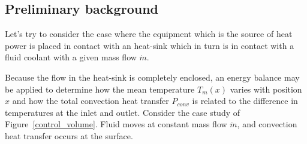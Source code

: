 \documentclass[12pt,a4paper,oneside]{book}
\begin{document}
\begin{onehalfspace}
\subsection{Preliminary background}
Let's try to consider the case where the equipment which is the source of heat power is placed in contact with an heat-sink which in turn is in contact with a fluid coolant with a given mass flow $\dot{m}$.

Because the flow in the heat-sink is completely enclosed, an energy balance may be applied to determine how the mean temperature $T_m(x)$ varies with position $x$ and how the total convection heat transfer $P_{conv}$ is related to the difference in temperatures at the inlet and outlet. Consider the case study of Figure~\ref{control_volume}. Fluid moves at constant mass flow $\dot{m}$, and convection heat transfer occurs at the surface. 


\end{onehalfspace}
\end{document}
